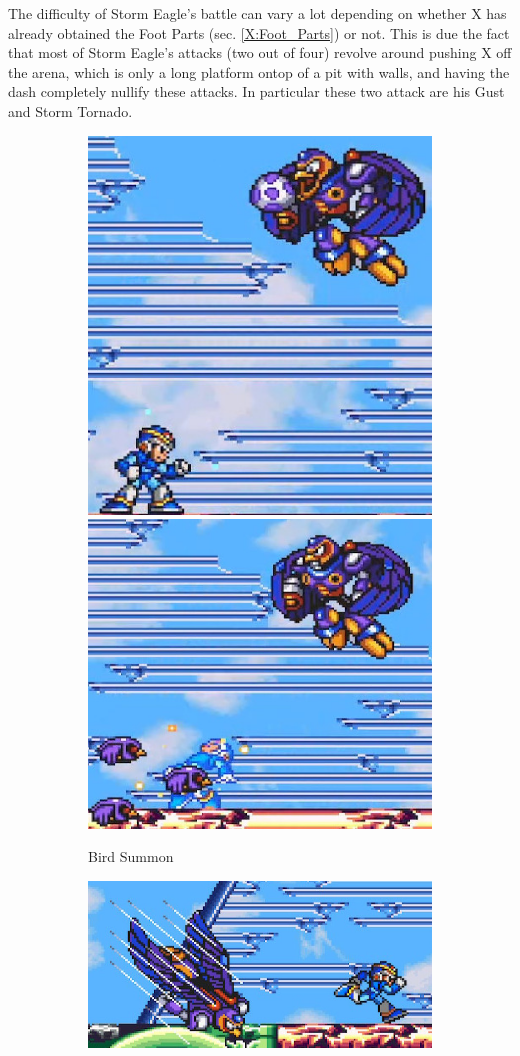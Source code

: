 The difficulty of Storm Eagle's battle can vary a lot depending on whether X has already obtained the Foot Parts (sec. \ref{X:Foot_Parts}) or not. This is due the fact that most of Storm Eagle's attacks (two out of four) revolve around pushing X off the arena, which is only a long platform ontop of a pit with walls, and having the dash completely nullify these attacks. In particular these two attack are his Gust~\cite{wiki:Storm_eagle} and Storm Tornado.
\begin{figure}[htp]
	\centering
	\begin{subfigure}{\linewidth}
		\centering
		\includegraphics[width=0.25\linewidth]{figures/X1/Storm_eagle/Eagle_egg_1.jpg}
		\includegraphics[width=0.3\linewidth]{figures/X1/Storm_eagle/Eagle_egg_2.jpg}
		\caption{Bird Summon}
	\end{subfigure}
	\begin{subfigure}{0.35\linewidth}
		\centering
		\includegraphics[width=\linewidth]{figures/X1/Storm_eagle/Eagle_dive.jpg}

\end{subfigure}
\end{figure}
